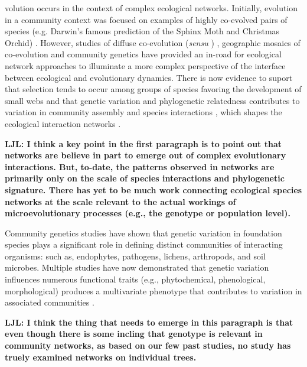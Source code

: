 \documentclass[9pt,twocolumn,twoside,lineno]{pnas-new}
\begin{document}
volution occurs in the context of complex ecological
networks. Initially, evolution in a community context was focused on
examples of highly co-evolved pairs of species (e.g. Darwin's famous
prediction of the Sphinx Moth and Christmas Orchid)
\cite{Wade2007}. However, studies of diffuse co-evolution
(\textit{sensu} \cite{Janzen1980}) \cite{Stinchcombe2002, Strauss2007,
  Dicke2010}, geographic mosaics of co-evolution \cite{Thompson2005}
and community genetics \cite{Whitham2006} have provided an in-road for
ecological network approaches \cite{Fortuna2009, Keith2017, Lau2016}
to illuminate a more complex perspective of the interface between
ecological and evolutionary dynamics. There is now evidence to suport
that selection tends to occur among groups of species \cite{Wade2007,
  Pieterse2007, Dicke2010} favoring the development of small webs
\cite{Nuismer2006, Guimaraes2007, Gomez2009} and that genetic
variation and phylogenetic relatedness contributes to variation in
community assembly \cite{Crutsinger2016} and species interactions
\cite{Whitham2006a, Bailey2009, Moya-Larano2011}, which shapes the
ecological interaction networks \cite{Rezende2007}.

\textbf{LJL: I think a key point in the first paragraph is to point
  out that networks are believe in part to emerge out of complex
  evolutionary interactions. But, to-date, the patterns observed in
  networks are primarily only on the scale of species interactions and
  phylogenetic signature. There has yet to be much work connecting
  ecological species networks at the scale relevant to the actual
  workings of microevolutionary processes (e.g., the genotype or
  population level).}


Community genetics studies \cite{Lamit2015a} have shown that
genetic variation in foundation species \cite{Ellison2005} plays a
significant role in defining distinct communities of interacting
organisms:  such as, endophytes, pathogens, lichens, arthropods, and
soil microbes. Multiple studies have now demonstrated that genetic
variation influences numerous functional traits (e.g., phytochemical,
phenological, morphological) produces a multivariate phenotype
\cite{holeski2012} that contributes to variation in associated
communities \cite{Bailey2009a}.

\textbf{LJL: I think the thing that needs to emerge in this paragraph
  is that even though there is some incling that genotype is relevant
  in community networks, as based on our few past studies, no study
  has truely examined networks on individual trees.}
\end{document}
